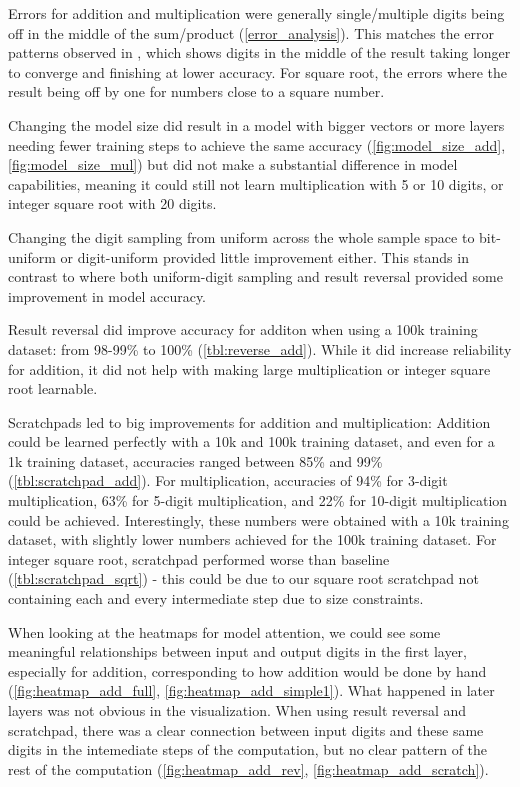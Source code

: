 Errors for addition and multiplication were generally single/multiple digits being off in the middle of the sum/product (\cref{error_analysis}). This matches the error patterns observed in , which shows digits in the middle of the result taking longer to converge and finishing at lower accuracy.
For square root, the errors where the result being off by one for numbers close to a square number.

Changing the model size did result in a model with bigger vectors or more layers needing fewer training steps to achieve the same accuracy (\cref{fig:model_size_add}, \cref{fig:model_size_mul}) but did not make a substantial difference in model capabilities, meaning it could still not learn multiplication with 5 or 10 digits, or integer square root with 20 digits.

Changing the digit sampling from uniform across the whole sample space to bit-uniform or digit-uniform provided little improvement either. This stands in contrast to \cite{positionmatters} where both uniform-digit sampling and result reversal provided some improvement in model accuracy.

Result reversal did improve accuracy for additon when using a 100k training dataset: from 98-99\% to 100\% (\cref{tbl:reverse_add}). While it did increase reliability for addition, it did not help with making large multiplication or integer square root learnable.

Scratchpads led to big improvements for addition and multiplication: Addition could be learned perfectly with a 10k and 100k training dataset, and even for a 1k training dataset, accuracies ranged between 85\% and 99\% (\cref{tbl:scratchpad_add}). For multiplication, accuracies of 94\% for 3-digit multiplication, 63\% for 5-digit multiplication, and 22\% for 10-digit multiplication could be achieved. Interestingly, these numbers were obtained with a 10k training dataset, with slightly lower numbers achieved for the 100k training dataset. For integer square root, scratchpad performed worse than baseline (\cref{tbl:scratchpad_sqrt}) - this could be due to our square root scratchpad not containing each and every intermediate step due to size constraints.

When looking at the heatmaps for model attention, we could see some meaningful relationships between input and output digits in the first layer, especially for addition, corresponding to how addition would be done by hand (\cref{fig:heatmap_add_full}, \cref{fig:heatmap_add_simple1}). What happened in later layers was not obvious in the visualization. When using result reversal and scratchpad, there was a clear connection between input digits and these same digits in the intemediate steps of the computation, but no clear pattern of the rest of the computation (\cref{fig:heatmap_add_rev}, \cref{fig:heatmap_add_scratch}).

